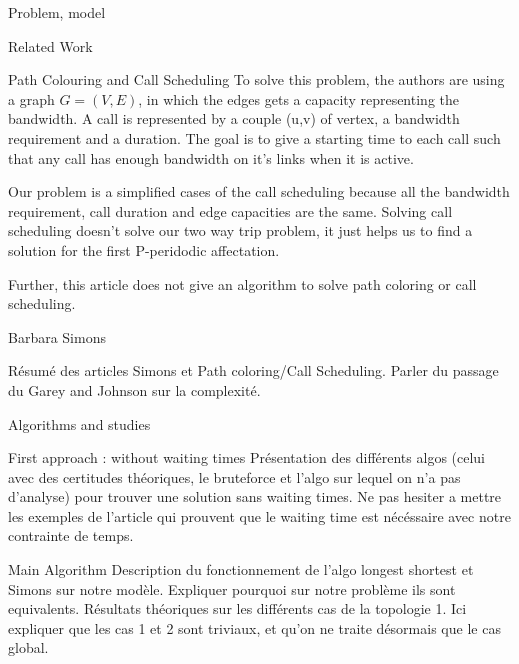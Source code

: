 \documentclass[a4paper,10pt]{report}
\begin{document}
\begin{chapter}{Problem, model}
\begin{section}{Related Work}
\begin{subsection}{Path Colouring and Call Scheduling}
To solve this problem, the authors are using a graph $G=(V,E)$, in which the edges gets a capacity representing the bandwidth.
A call is represented by a couple (u,v) of vertex, a bandwidth requirement and a duration. The goal is to give a starting time to each call
such that any call has enough bandwidth on it's links when it is active.

Our problem is a simplified cases of the call scheduling because all the bandwidth requirement, call duration and edge capacities are the same.
Solving call scheduling doesn't solve our two way trip problem, it just helps us to find a solution for the first P-peridodic affectation.

Further, this article does not give an algorithm to solve path coloring or call scheduling.

\end{subsection}

\begin{subsection}{Barbara Simons}
 \cite{simons1978fast}
\end{subsection}

Résumé des articles Simons et Path coloring/Call Scheduling.
Parler du passage du Garey and Johnson sur la complexité.
 \end{section}


\end{chapter}

\begin{chapter}{Algorithms and studies }


\begin{section}{First approach : without waiting times}
 Présentation des différents algos (celui avec des certitudes théoriques, le bruteforce et l'algo sur lequel on n'a pas d'analyse) pour trouver 
 une solution sans waiting times. Ne pas hesiter a mettre les exemples de l'article qui prouvent que le waiting time est nécéssaire avec notre contrainte de temps.
 \end{section}

\begin{section}{Main Algorithm}
Description du fonctionnement de l'algo longest shortest et Simons sur notre modèle. Expliquer pourquoi sur notre problème ils sont equivalents.
 Résultats théoriques sur les différents cas de la topologie 1. Ici expliquer que les cas 1 et 2 sont triviaux, et qu'on ne traite désormais que le 
 cas global.
\end{section}

\end{chapter}
\end{document}
